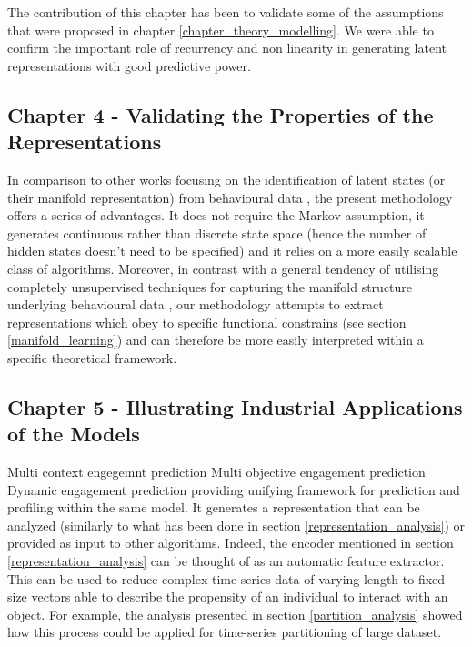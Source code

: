 The contribution of this chapter has been to validate some of the assumptions that were proposed in chapter \ref{chapter_theory_modelling}. We were able to confirm the important role of recurrency and non linearity in generating latent representations with good predictive power. 

\subsection{Chapter 4 - Validating the Properties of the Representations}
\label{discussion_chapter_four}
In comparison to other works focusing on the identification of latent states (or their manifold representation) from behavioural data \cite{calhoun2019unsupervised, luxem2020identifying, pereira2020quantifying, shi2021learning, mccullough2021unsupervised}, the present methodology offers a series of advantages. It does not require the Markov assumption, it generates continuous rather than discrete state space (hence the number of hidden states doesn't need to be specified) and it relies on a more easily scalable class of algorithms. Moreover, in contrast with a general tendency of utilising completely unsupervised techniques for capturing the manifold structure underlying behavioural data \cite{calhoun2019unsupervised, luxem2020identifying, pereira2020quantifying, shi2021learning, mccullough2021unsupervised}, our methodology attempts to extract representations which obey to specific functional constrains (see section \ref{manifold_learning}) and can therefore be more easily interpreted within a specific theoretical framework.

\subsection{Chapter 5 - Illustrating Industrial Applications of the Models}
\label{discussion_chapter_five}

Multi context engegemnt prediction
Multi objective engagement prediction
Dynamic engagement prediction
providing unifying framework for prediction and profiling within the same model.
It generates a representation that can be analyzed (similarly to what has been done in section \ref{representation_analysis}) or provided as input to other algorithms. Indeed, the encoder mentioned in section \ref{representation_analysis} can be thought of as an automatic feature extractor. This can be used to reduce complex time series data of varying length to fixed-size vectors able to describe the propensity of an individual to interact with an object. For example, the analysis presented in section \ref{partition_analysis} showed how this process could be applied for time-series partitioning of large dataset.

